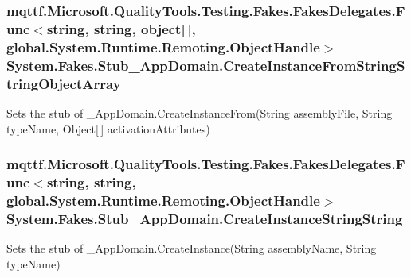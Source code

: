 \hypertarget{class_system_1_1_fakes_1_1_stub___app_domain_a69b79ca5168f5e9f2e75506c1332db0e}{
\subsubsection[{Create\-Instance\-From\-String\-String\-Object\-Array}]{\setlength{\rightskip}{0pt plus 5cm}mqttf.\-Microsoft.\-Quality\-Tools.\-Testing.\-Fakes.\-Fakes\-Delegates.\-Func$<$string, string, object\mbox{[}$\,$\mbox{]}, global.\-System.\-Runtime.\-Remoting.\-Object\-Handle$>$ System.\-Fakes.\-Stub\-\_\-\-App\-Domain.\-Create\-Instance\-From\-String\-String\-Object\-Array}}\label{class_system_1_1_fakes_1_1_stub___app_domain_a69b79ca5168f5e9f2e75506c1332db0e}


Sets the stub of \-\_\-\-App\-Domain.\-Create\-Instance\-From(\-String assembly\-File, String type\-Name, Object\mbox{[}$\,$\mbox{]} activation\-Attributes)

\hypertarget{class_system_1_1_fakes_1_1_stub___app_domain_a6a53101dd2c9a95e3ed81e5c82b65ff8}{
\subsubsection[{Create\-Instance\-String\-String}]{\setlength{\rightskip}{0pt plus 5cm}mqttf.\-Microsoft.\-Quality\-Tools.\-Testing.\-Fakes.\-Fakes\-Delegates.\-Func$<$string, string, global.\-System.\-Runtime.\-Remoting.\-Object\-Handle$>$ System.\-Fakes.\-Stub\-\_\-\-App\-Domain.\-Create\-Instance\-String\-String}}\label{class_system_1_1_fakes_1_1_stub___app_domain_a6a53101dd2c9a95e3ed81e5c82b65ff8}


Sets the stub of \-\_\-\-App\-Domain.\-Create\-Instance(\-String assembly\-Name, String type\-Name)


